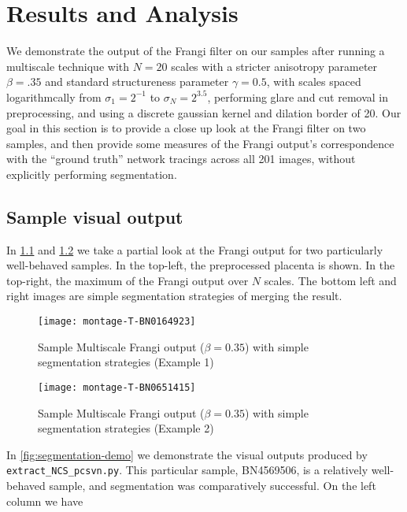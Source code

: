 \chapter{Results and Analysis} \label{ch:results-analysis}

We demonstrate the output of the Frangi filter on our samples after running a multiscale technique with $N=20$ scales with a stricter anisotropy parameter $\beta = .35$ and standard structureness parameter $\gamma=0.5$,
with scales spaced logarithmcally from $\sigma_1 = 2^{-1}$ to $\sigma_N = 2^{3.5}$, performing glare and cut removal in preprocessing, and using a discrete gaussian kernel and dilation border of 20.
Our goal in this section is to provide a close up look at the Frangi filter on two samples, and then provide some measures of the Frangi output's correspondence with the ``ground truth'' network tracings across all 201 images, without explicitly performing segmentation.
\section{Sample visual output}
In \cref{fig:output-montage-example1} and \cref{fig:output-montage-example2} we take a partial look at the Frangi output for two particularly well-behaved samples. In the top-left, the preprocessed placenta is shown. In the top-right, the maximum of the Frangi output over $N$ scales. The bottom left and right images are simple segmentation strategies of merging the result.

\begin{figure} \centering
  \texttt{[image: montage-T-BN0164923]}
  \caption{Sample Multiscale Frangi output ($\beta=0.35$) with simple segmentation strategies (Example 1)}
  \label{fig:output-montage-example1}
\end{figure}

\begin{figure} \centering
  \texttt{[image: montage-T-BN0651415]}
  \caption{Sample Multiscale Frangi output ($\beta=0.35$) with simple segmentation strategies (Example 2)}
  \label{fig:output-montage-example2}
\end{figure}







In \cref{fig:segmentation-demo} we demonstrate the visual outputs produced by \texttt{extract\_NCS\_pcsvn.py}. This particular sample, BN4569506, is a relatively well-behaved sample, and segmentation was comparatively successful. On the left column we have 


